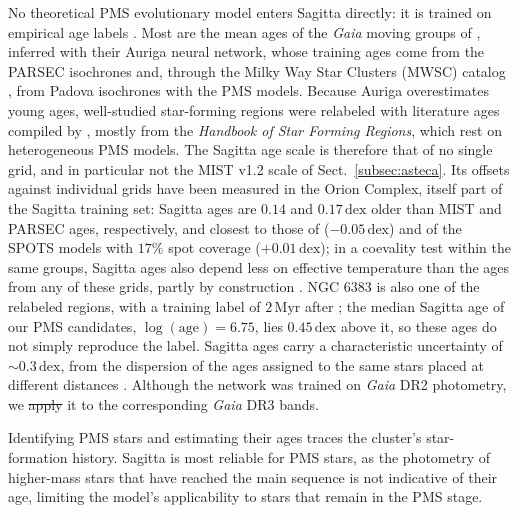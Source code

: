 \documentclass{aa}
\providecommand{\DIFaddtex}[1]{{\protect\color{red}\uwave{#1}}} %
\providecommand{\DIFdeltex}[1]{{\protect\color{red}\sout{#1}}} %
\providecommand{\DIFaddbegin}{} %
\providecommand{\DIFaddend}{} %
\providecommand{\DIFdelbegin}{} %
\providecommand{\DIFdelend}{} %
\providecommand{\DIFadd}[1]{\texorpdfstring{\DIFaddtex{#1}}{#1}} %
\providecommand{\DIFdel}[1]{\texorpdfstring{\DIFdeltex{#1}}{}} %
\providecommand{\DIFscaledelfig}{0.5}
\newlength{\DIFdelgraphicswidth} %
\newlength{\DIFdelgraphicsheight} %
\providecommand{\DIFaddincludegraphics}[2][]{{\color{blue}\fbox{\DIFOincludegraphics[#1]{#2}}}} %
\providecommand{\DIFdelincludegraphics}[2][]{%
\sbox{\DIFdelgraphicsbox}{\DIFOincludegraphics[#1]{#2}}%
\settoboxwidth{\DIFdelgraphicswidth}{\DIFdelgraphicsbox} %
\settoboxtotalheight{\DIFdelgraphicsheight}{\DIFdelgraphicsbox} %
\scalebox{\DIFscaledelfig}{%
\parbox[b]{\DIFdelgraphicswidth}{\usebox{\DIFdelgraphicsbox}\\[-\baselineskip] \rule{\DIFdelgraphicswidth}{0em}}\llap{\resizebox{\DIFdelgraphicswidth}{\DIFdelgraphicsheight}{%
\setlength{\unitlength}{\DIFdelgraphicswidth}%
\begin{picture}(1,1)%
\thicklines\linethickness{2pt} %
{\color[rgb]{1,0,0}\put(0,0){\framebox(1,1){}}}%
{\color[rgb]{1,0,0}\put(0,0){\line( 1,1){1}}}%
{\color[rgb]{1,0,0}\put(0,1){\line(1,-1){1}}}%
\end{picture}%
}\hspace*{3pt}}} %
} %
\DeclareRobustCommand{\DIFaddbegin}{\DIFOaddbegin \let\includegraphics\DIFaddincludegraphics} %
\DeclareRobustCommand{\DIFaddend}{\DIFOaddend \let\includegraphics\DIFOincludegraphics} %
\DeclareRobustCommand{\DIFdelbegin}{\DIFOdelbegin \let\includegraphics\DIFdelincludegraphics} %
\DeclareRobustCommand{\DIFdelend}{\DIFOaddend \let\includegraphics\DIFOincludegraphics} %
\begin{document}
No theoretical PMS evolutionary model enters Sagitta directly: it is trained on empirical age labels \citep{2021AJ....162..282M}. Most are the mean ages of the \textit{Gaia} moving groups of \citet{2020AJ....160..279K}, inferred with their Auriga neural network, whose training ages come from the PARSEC isochrones \citep{2017ApJ...835...77M} and, through the Milky Way Star Clusters (MWSC) catalog \citep{2013A&A...558A..53K}, from Padova isochrones with the \citet{2000A&A...358..593S} PMS models. Because Auriga overestimates young ages, well-studied star-forming regions were relabeled with literature ages compiled by \citet{2021AJ....162..282M}, mostly from the \textit{Handbook of Star Forming Regions}, which rest on heterogeneous PMS models. The Sagitta age scale is therefore that of no single grid, and in particular not the MIST v1.2 scale of Sect.~\ref{subsec:asteca}. Its offsets against individual grids have been measured in the Orion Complex, itself part of the Sagitta training set: Sagitta ages are $0.14$ and $0.17\,\mathrm{dex}$ older than MIST and PARSEC ages, respectively, and closest to those of \citet{2015A&A...577A..42B} ($-0.05\,\mathrm{dex}$) and of the SPOTS models \citep{2020ApJ...891...29S} with $17\%$ spot coverage ($+0.01\,\mathrm{dex}$); in a coevality test within the same groups, Sagitta ages also depend less on effective temperature than the ages from any of these grids, partly by construction \citep{2023AJ....165..182K}. NGC 6383 is also one of the relabeled regions, with a training label of $2\,\mathrm{Myr}$ after \citet{2008hsf2.book..497R}; the median Sagitta age of our PMS candidates, $\log(\mathrm{age})=6.75$, lies $0.45\,\mathrm{dex}$ above it, so these ages do not simply reproduce the label. Sagitta ages carry a characteristic uncertainty of $\sim0.3\,\mathrm{dex}$, from the dispersion of the ages assigned to the same stars placed at different distances \citep{2021AJ....162..282M}. Although the network was trained on \textit{Gaia} DR2 photometry, we \DIFdelbegin \DIFdel{apply }\DIFdelend \DIFaddbegin \DIFadd{applied }\DIFaddend it to the corresponding \textit{Gaia} DR3 bands.

Identifying PMS stars and estimating their ages traces the cluster's star-formation history. Sagitta is most reliable for PMS stars, as the photometry of higher-mass stars that have reached the main sequence is not indicative of their age, limiting the model's applicability to stars that remain in the PMS stage.
\end{document}
